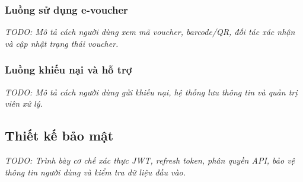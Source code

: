 \subsubsection{Luồng sử dụng e-voucher}
\textit{TODO: Mô tả cách người dùng xem mã voucher, barcode/QR, đối tác xác nhận và cập nhật trạng thái voucher.}

\subsubsection{Luồng khiếu nại và hỗ trợ}
\textit{TODO: Mô tả cách người dùng gửi khiếu nại, hệ thống lưu thông tin và quản trị viên xử lý.}

\subsection{Thiết kế bảo mật}
\textit{TODO: Trình bày cơ chế xác thực JWT, refresh token, phân quyền API, bảo vệ thông tin người dùng và kiểm tra dữ liệu đầu vào.}

